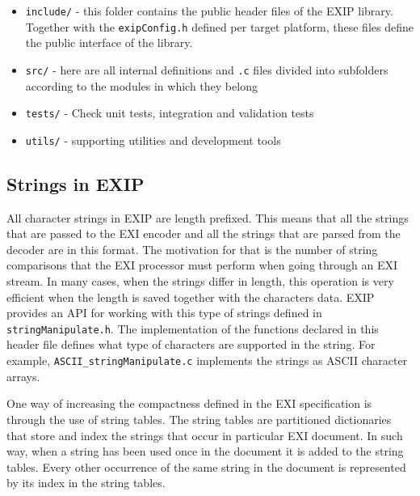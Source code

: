 \begin{itemize}
 \item \texttt{include/} - this folder contains the public header files of the EXIP library.
			  Together with the \texttt{exipConfig.h} defined per target platform, these files
			  define the public interface of the library.

 \item \texttt{src/} - here are all internal definitions and \texttt{.c} files divided into
	      subfolders according to the modules in which they belong

 \item \texttt{tests/} - Check unit tests, integration and validation tests

 \item \texttt{utils/} - supporting utilities and development tools

\end{itemize}


\subsection{Strings in EXIP}
\label{sec:strings}

All character strings in EXIP are length prefixed. This means that all the strings that are passed to
the EXI encoder and all the strings that are parsed from the decoder are in this format. The motivation
for that is the number of string comparisons that the EXI processor must perform when going through an
EXI stream. In many cases, when the strings differ in length, this operation is very efficient
when the length is saved together with the characters data. EXIP provides an API for working with
this type of strings defined in \texttt{stringManipulate.h}. The implementation of the functions
declared in this header file defines what type of characters are supported in the string.
For example, \texttt{ASCII\_stringManipulate.c} implements the strings as ASCII character arrays.

One way of increasing the compactness defined in the EXI specification is through the use of string tables.
The string tables are partitioned dictionaries that store and index the strings that occur in particular
EXI document. In such way, when a string has been used once in the document it is added to the string tables.
Every other occurrence of the same string in the document is represented by its index in the string tables.

